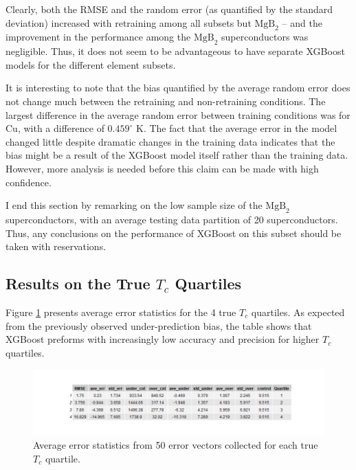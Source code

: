 \documentclass[oneside,12pt]{amsart}
\begin{document}
 Clearly, both the RMSE and the random error (as quantified by the standard deviation) increased with retraining among all subsets but $\text{MgB}_2$ -- and the improvement in the performance among the $\text{MgB}_2$ superconductors was negligible. Thus, it does not seem to be advantageous to have separate XGBoost models for the different element subsets.
 
 It is interesting to note that the bias quantified by the average random error does not change much between the retraining and non-retraining conditions. The largest difference in the average random error between training conditions was for Cu, with a difference of $0.459^\circ$ K. The fact that the average error in the model changed little despite dramatic changes in the training data indicates that the bias might be a result of the XGBoost model itself rather than the training data. However, more analysis is needed before this claim can be made with high confidence.
 
 I end this section by remarking on the low sample size of the $\text{MgB}_2$ superconductors, with an average testing data partition of 20 superconductors. Thus, any conclusions on the performance of XGBoost on this subset should be taken with reservations.
 
 \subsection{Results on the True $T_c$ Quartiles}
 
 Figure \ref{fig:quart_true_ave_tbl} presents average error statistics for the 4 true $T_c$ quartiles. As expected from the previously observed under-prediction bias, the table shows that XGBoost preforms with increasingly low accuracy and precision for higher $T_c$ quartiles.
 
 \begin{figure}
     \centering
     \includegraphics[width = \linewidth]{quart_true_ave_tbl.png}
     \caption{Average error statistics from 50 error vectors collected for each true $T_c$ quartile.}
     \label{fig:quart_true_ave_tbl}
 \end{figure}
 
\end{document}
